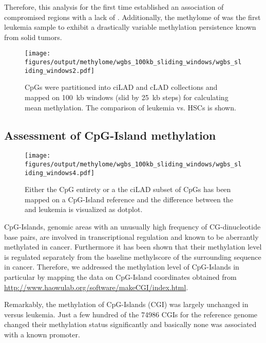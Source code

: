 Therefore, this analysis for the first time established an association of compromised regions with a lack of . Additionally, the methylome of \dnmtchip \mllafnine was the first leukemia sample to exhibit a drastically variable methylation persistence known from solid tumors\cite{Timp2014}. 

\begin{figure}[!ht] 
	\centering
	\texttt{[image: figures/output/methylome/wgbs\_100kb\_sliding\_windows/wgbs\_sliding\_windows2.pdf]} 
	\caption[Scatterplot of averaged ciLAD / cLAD CpGs in wild-type leukemia vs. HSC]{CpGs were partitioned into ciLAD and cLAD collections and mapped on \SI{100}{\kilo b} windows (slid by \SI{25}{\kilo b} steps) for calculating mean methylation. The comparison of \dnmtwt \kitpos leukemia vs. HSCs is shown.}
	\label{fig:wgbs_sliding_windows3}
\end{figure}

\subsection{Assessment of CpG-Island methylation}
\label{chap:r:wgbs:lad_demethylation_cgi}

\begin{figure}[!bht] 
	\centering
	\texttt{[image: figures/output/methylome/wgbs\_100kb\_sliding\_windows/wgbs\_sliding\_windows4.pdf]} 
	\caption[Scatterplot of CGI methylation in leukemia ]{Either the CpG entirety or a the ciLAD subset of CpGs has been mapped on a CpG-Island reference and the difference between the \dnmtchip and \dnmtwt leukemia is visualized as dotplot.}
	\label{fig:wgbs_sliding_windows4}
\end{figure}

CpG-Islands, genomic areas with an unusually high frequency of CG-dinucleotide base pairs, are involved in transcriptional regulation and known to be aberrantly methylated in cancer\cite{Issa2004,Rodriguez-Paredes2011}. Furthermore it has been shown that their methylation level is regulated separately from the baseline methylscore of the surrounding sequence in cancer\cite{Lee2015}. Therefore, we addressed the methylation level of CpG-Islands in particular by mapping the data on CpG-Island coordinates obtained from \url{http://www.haowulab.org/software/makeCGI/index.html}\cite{wu2010redefining}. 

 Remarkably, the methylation of CpG-Islands (CGI) was largely unchanged in \dnmtchip \kitpos versus \dnmtwt \kitpos leukemia. Just a few hundred of the \num{74986} CGIs for the \mmnine reference genome changed their methylation status significantly and basically none was associated with a known promoter\dns. 
 
